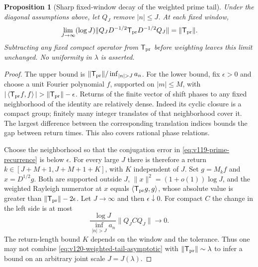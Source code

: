 \documentclass[11pt]{article}
\newtheorem{proposition}[theorem]{Proposition}
\theoremstyle{remark}
\newcommand{\ip}[2]{\left\langle #1,#2\right\rangle}
\begin{document}
\begin{proposition}[Sharp fixed-window decay of the weighted prime tail]
\label{prop:v120-weighted-tail-asymptotic}
Under the diagonal assumptions above, let $Q_J$ remove $|n|\le J$.
At each fixed window,
\begin{equation}\label{eq:v120-weighted-tail-asymptotic}
 \lim_{J\to\infty}(\log J)
 \|Q_JD^{-1/2}\mathsf T_{\rm pr}D^{-1/2}Q_J\|
       =\|\mathsf T_{\rm pr}\|.
\end{equation}
Subtracting any fixed compact operator from $\mathsf T_{\rm pr}$
before weighting leaves this limit unchanged. No uniformity in
$\lambda$ is asserted.
\end{proposition}
\begin{proof}
The upper bound is
$\|\mathsf T_{\rm pr}\|/\inf_{|n|>J}a_n$.
For the lower bound, fix $\epsilon>0$ and choose a unit Fourier
polynomial $f$, supported on $|m|\le M$, with
$|\ip{\mathsf T_{\rm pr}f}{f}|>\|\mathsf T_{\rm pr}\|-\epsilon$.
Returns of the finite vector of shift phases to any fixed neighborhood
of the identity are relatively dense. Indeed its cyclic closure is a
compact group; finitely many integer translates of that neighborhood
cover it. The largest difference between the corresponding translation
indices bounds the gap between return times. This also covers rational
phase relations.

Choose the neighborhood so that the conjugation error in
\eqref{eq:v119-prime-recurrence} is below $\epsilon$.
For every large $J$ there is therefore a return
$k\in[J+M+1,J+M+1+K]$, with $K$ independent of $J$.
Set $g=M_kf$ and $x=D^{1/2}g$. Both are supported outside $J$,
$\|x\|^2=(1+o(1))\log J$, and the weighted Rayleigh numerator
at $x$ equals $\ip{\mathsf T_{\rm pr}g}{g}$, whose absolute value
is greater than $\|\mathsf T_{\rm pr}\|-2\epsilon$.
Let $J\to\infty$ and then $\epsilon\downarrow0$.
For compact $C$ the change in the left side is at most
\[
 \frac{\log J}{\inf_{|n|>J}a_n}\|Q_JCQ_J\|\longrightarrow0.
\]
The return-length bound $K$ depends on the window and the tolerance.
Thus one may not combine \eqref{eq:v120-weighted-tail-asymptotic}
with $\|\mathsf T_{\rm pr}\|\sim\lambda$ to infer a bound on
an arbitrary joint scale $J=J(\lambda)$.
\end{proof}
\end{document}
